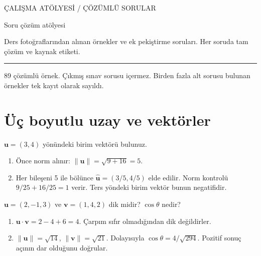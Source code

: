
{\sffamily\small\color{accent} ÇALIŞMA ATÖLYESİ / ÇÖZÜMLÜ SORULAR\par}
\vspace{8mm}
{\Huge\sffamily\bfseries\raggedright{} Soru çözüm atölyesi\par}
\vspace{3mm}
{\large Ders fotoğraflarından alınan örnekler ve ek pekiştirme soruları. Her soruda tam çözüm ve kaynak etiketi.\par}
\vspace{4mm}\hrule\vspace{4mm}89 çözümlü örnek. Çıkmış sınav sorusu içermez. Birden fazla alt sorusu bulunan örnekler tek kayıt olarak sayıldı.
\tableofcontents\clearpage
\clearpage\section{Üç boyutlu uzay ve vektörler}
\begin{tcolorbox}[title={Örnek 1.1 | Birim vektör},colframe=accent]\(\mathbf u=(3,4)\) yönündeki birim vektörü bulunuz.
\par{}\end{tcolorbox}
\begin{tcolorbox}[title={Adım adım çözüm},colback=green!3!white,colframe=green]\begin{enumerate}
\item Önce norm alınır: \(\|\mathbf u\|=\sqrt{9+16}=5\).
\item Her bileşeni 5 ile bölünce \(\widehat{\mathbf u}=(3/5,4/5)\) elde edilir. Norm kontrolü \(9/25+16/25=1\) verir. Ters yöndeki birim vektör bunun negatifidir.
\end{enumerate}\end{tcolorbox}
\begin{tcolorbox}[title={Örnek 1.2 | Dersteki açı sorusu},colframe=accent]\(\mathbf u=(2,-1,3)\) ve \(\mathbf v=(1,4,2)\) dik midir? \(\cos\theta\) nedir?
\par{}\end{tcolorbox}
\begin{tcolorbox}[title={Adım adım çözüm},colback=green!3!white,colframe=green]\begin{enumerate}
\item \(\mathbf u\cdot\mathbf v=2-4+6=4\). Çarpım sıfır olmadığından dik değildirler.
\item \(\|\mathbf u\|=\sqrt{14}\), \(\|\mathbf v\|=\sqrt{21}\). Dolayısıyla \(\cos\theta=4/\sqrt{294}\). Pozitif sonuç açının dar olduğunu doğrular.
\end{enumerate}\end{tcolorbox}
